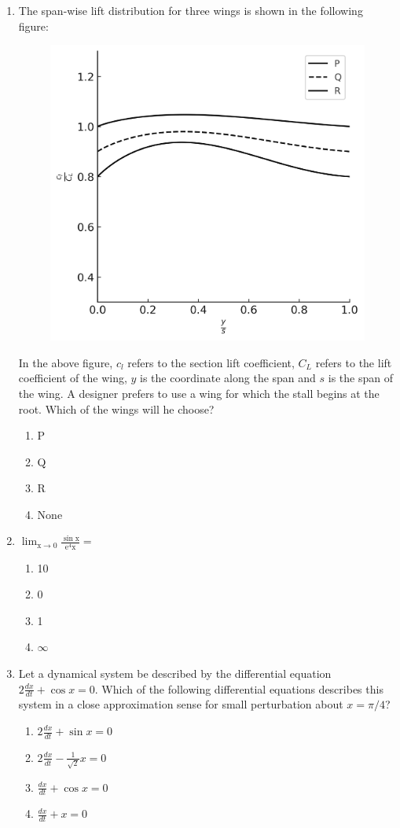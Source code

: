 \documentclass{article}
\begin{document}
\begin{enumerate}
    \item The span-wise lift distribution for three wings is shown in the following figure:
    \begin{figure}
        \centering
        \includegraphics[width=0.5\columnwidth]{figs/q68.png}
        \caption{}
        \label{fig:q68}
    \end{figure}
    In the above figure, $c_l$ refers to the section lift coefficient, $C_L$ refers to the lift coefficient of the wing, $y$ is the coordinate along the span and $s$ is the span of the wing. A designer prefers to use a wing for which the stall begins at the root. Which of the wings will he choose?
    \begin{multicols}{4}
    \begin{enumerate}
        \item P
        \item Q
        \item R
        \item None
    \end{enumerate}
    \end{multicols}
    

    \item $\mathrm{\lim_{x \to 0} \frac{\sin x}{e^4 x} =}$
    \begin{multicols}{4}
    \begin{enumerate}
        \item 10
        \item 0
        \item 1
        \item $\infty$
    \end{enumerate}
    \end{multicols}
    

    \item Let a dynamical system be described by the differential equation $2 \frac{dx}{dt} + \cos x = 0$. Which of the following differential equations describes this system in a close approximation sense for small perturbation about $x = \pi/4$?
    \begin{multicols}{2}
    \begin{enumerate}
        \item $2 \frac{dx}{dt} + \sin x = 0$
        \item $2 \frac{dx}{dt} - \frac{1}{\sqrt{2}} x = 0$
        \item $\frac{dx}{dt} + \cos x = 0$
        \item $\frac{dx}{dt} + x = 0$
    \end{enumerate}
    \end{multicols}
    

\end{enumerate}
\end{document}
